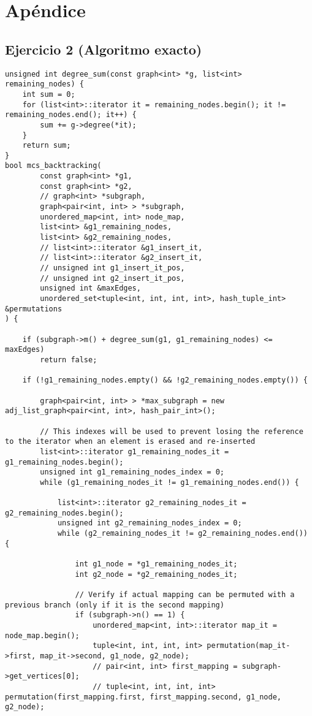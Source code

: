 \section{Apéndice}
\subsection{Ejercicio 2 (Algoritmo exacto)}
\begin{lstlisting}
unsigned int degree_sum(const graph<int> *g, list<int> remaining_nodes) {
    int sum = 0;
    for (list<int>::iterator it = remaining_nodes.begin(); it != remaining_nodes.end(); it++) {
        sum += g->degree(*it);
    }
    return sum;
}
bool mcs_backtracking(
        const graph<int> *g1,
        const graph<int> *g2,
        // graph<int> *subgraph,
        graph<pair<int, int> > *subgraph,
        unordered_map<int, int> node_map,
        list<int> &g1_remaining_nodes,
        list<int> &g2_remaining_nodes,
        // list<int>::iterator &g1_insert_it,
        // list<int>::iterator &g2_insert_it,
        // unsigned int g1_insert_it_pos,
        // unsigned int g2_insert_it_pos,
        unsigned int &maxEdges,
        unordered_set<tuple<int, int, int, int>, hash_tuple_int> &permutations
) {

    if (subgraph->m() + degree_sum(g1, g1_remaining_nodes) <= maxEdges)
        return false;

    if (!g1_remaining_nodes.empty() && !g2_remaining_nodes.empty()) {

        graph<pair<int, int> > *max_subgraph = new adj_list_graph<pair<int, int>, hash_pair_int>();

        // This indexes will be used to prevent losing the reference to the iterator when an element is erased and re-inserted
        list<int>::iterator g1_remaining_nodes_it = g1_remaining_nodes.begin();
        unsigned int g1_remaining_nodes_index = 0;
        while (g1_remaining_nodes_it != g1_remaining_nodes.end()) {

            list<int>::iterator g2_remaining_nodes_it = g2_remaining_nodes.begin();
            unsigned int g2_remaining_nodes_index = 0;
            while (g2_remaining_nodes_it != g2_remaining_nodes.end()) {

                int g1_node = *g1_remaining_nodes_it;
                int g2_node = *g2_remaining_nodes_it;

                // Verify if actual mapping can be permuted with a previous branch (only if it is the second mapping)
                if (subgraph->n() == 1) {
                    unordered_map<int, int>::iterator map_it = node_map.begin();
                    tuple<int, int, int, int> permutation(map_it->first, map_it->second, g1_node, g2_node);
                    // pair<int, int> first_mapping = subgraph->get_vertices[0];
                    // tuple<int, int, int, int> permutation(first_mapping.first, first_mapping.second, g1_node, g2_node);


\end{lstlisting}
